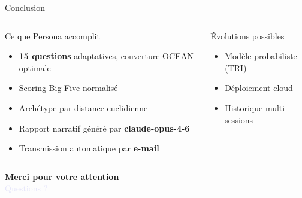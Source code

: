 \documentclass[aspectratio=169]{beamer}
\begin{document}
\begin{frame}{Conclusion}

  \begin{columns}[T]
    \begin{block}{Ce que Persona accomplit}
      \begin{itemize}
        \item \textbf{15 questions} adaptatives, couverture OCEAN optimale
        \item Scoring Big Five normalisé
        \item Archétype par distance euclidienne
        \item Rapport narratif généré par \textbf{claude-opus-4-6}
        \item Transmission automatique par \textbf{e-mail}
      \end{itemize}
    \end{block}

    \begin{block}{Évolutions possibles}
      \begin{itemize}
        \item Modèle probabiliste (TRI)
        \item Déploiement cloud
        \item Historique multi-sessions
      \end{itemize}
    \end{block}
  \end{columns}

  \vspace{1.5em}
  \begin{center}
    {\Large\textbf{Merci pour votre attention}}\\[0.4em]
    \textcolor{lavender}{Questions ?}
  \end{center}

\end{frame}
\end{document}
